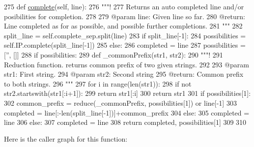 \begin{DoxyCode}
275   \textcolor{keyword}{def }\hyperlink{classvisualizer_1_1ipython__view_1_1IterableIPShell_afed775eb1a75f249c5cc7dc646e1948f}{complete}(self, line):
276     \textcolor{stringliteral}{"""!}
277 \textcolor{stringliteral}{    Returns an auto completed line and/or posibilities for completion.}
278 \textcolor{stringliteral}{    }
279 \textcolor{stringliteral}{    @param line: Given line so far.}
280 \textcolor{stringliteral}{    @return: Line completed as for as possible, and possible further completions.}
281 \textcolor{stringliteral}{    """}
282     split\_line = self.complete\_sep.split(line)
283     \textcolor{keywordflow}{if} split\_line[-1]:
284       possibilities = self.IP.complete(split\_line[-1])
285     \textcolor{keywordflow}{else}:
286       completed = line
287       possibilities = [\textcolor{stringliteral}{''}, []]
288     \textcolor{keywordflow}{if} possibilities:
289       \textcolor{keyword}{def }\_commonPrefix(str1, str2):
290         \textcolor{stringliteral}{"""!}
291 \textcolor{stringliteral}{        Reduction function. returns common prefix of two given strings.}
292 \textcolor{stringliteral}{        }
293 \textcolor{stringliteral}{        @param str1: First string.}
294 \textcolor{stringliteral}{        @param str2: Second string}
295 \textcolor{stringliteral}{        @return: Common prefix to both strings.}
296 \textcolor{stringliteral}{        """}
297         \textcolor{keywordflow}{for} i \textcolor{keywordflow}{in} range(len(str1)):
298           \textcolor{keywordflow}{if} \textcolor{keywordflow}{not} str2.startswith(str1[:i+1]):
299             \textcolor{keywordflow}{return} str1[:i]
300         \textcolor{keywordflow}{return} str1
301       \textcolor{keywordflow}{if} possibilities[1]:
302         common\_prefix = reduce(\_commonPrefix, possibilities[1]) \textcolor{keywordflow}{or} line[-1]
303         completed = line[:-len(split\_line[-1])]+common\_prefix
304       \textcolor{keywordflow}{else}:
305         completed = line
306     \textcolor{keywordflow}{else}:
307       completed = line
308     \textcolor{keywordflow}{return} completed, possibilities[1]
309   
310 
\end{DoxyCode}


Here is the caller graph for this function\+:


